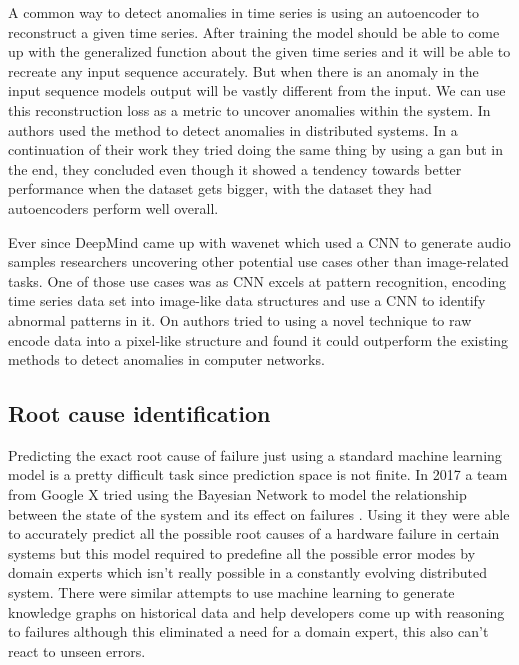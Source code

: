A common way to detect anomalies in time series is using an autoencoder to reconstruct a given time series. After training the model should be able to come up with the generalized function about the given time series and it will be able to recreate any input sequence accurately. But when there is an anomaly in the input sequence models output will be vastly different from the input. We can use this reconstruction loss as a metric to uncover anomalies within the system. In \cite{kumarage2018anomaly} authors used the method to detect anomalies in distributed systems. In a continuation of their work \cite{kumarage2019generative} they tried doing the same thing by using a \ac{gan} but in the end, they concluded even though it showed a tendency towards better performance when the dataset gets bigger, with the dataset they had autoencoders perform well overall.

Ever since DeepMind came up with wavenet which used a CNN to generate audio samples \citep{oord2016wavenet} researchers uncovering other potential use cases other than image-related tasks. One of those use cases was as CNN excels at pattern recognition, encoding time series data set into image-like data structures and use a CNN to identify abnormal patterns in it. On \cite{kim2018encoding} authors tried to using a novel technique to raw encode data into a pixel-like structure and found it could outperform the existing methods to detect anomalies in computer networks.

\subsection{Root cause identification}

Predicting the exact root cause of failure just using a standard machine learning model is a pretty difficult task since prediction space is not finite. In 2017 a team from Google X tried using the Bayesian Network to model the relationship between the state of the system and its effect on failures \citep{chigurupati2017root}. Using it they were able to accurately predict all the possible root causes of a hardware failure in certain systems but this model required to predefine all the possible error modes by domain experts which isn't really possible in a constantly evolving distributed system. There were similar attempts \cite{gonzalez2017root} to use machine learning to generate knowledge graphs on historical data and help developers come up with reasoning to failures although this eliminated a need for a domain expert, this also can't react to unseen errors.

